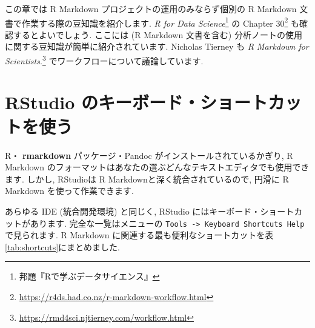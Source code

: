 \documentclass[
  11pt,
  lualatex,
  ja=standard]{bxjsreport}
\renewcommand{\href}[2]{#2\footnote{\url{#1}}}
\begin{document}
この章では R Markdown プロジェクトの運用のみならず個別の R Markdown 文書で作業する際の豆知識を紹介します. \emph{R for Data Science}\footnote{邦題『Rで学ぶデータサイエンス』} \autocite{wickham2016} の \href{https://r4ds.had.co.nz/r-markdown-workflow.html}{Chapter 30} も確認するとよいでしょう. ここには (R Markdown 文書を含む) 分析ノートの使用に関する豆知識が簡単に紹介されています. Nicholas Tierney も \href{https://rmd4sci.njtierney.com/workflow.html}{\emph{R Markdown for Scientists}.} でワークフローについて議論しています.

\hypertarget{rstudio-shortcuts}{%
\section{RStudio のキーボード・ショートカットを使う}\label{rstudio-shortcuts}}

R・ \textbf{rmarkdown} パッケージ・Pandoc がインストールされているかぎり, R Markdown のフォーマットはあなたの選ぶどんなテキストエディタでも使用できます. しかし, RStudioは R Markdownと深く統合されているので, 円滑に R Markdown を使って作業できます.

あらゆる IDE (統合開発環境) と同じく, RStudio にはキーボード・ショートカットがあります. 完全な一覧はメニューの \texttt{Tools -\textgreater{}\ Keyboard\ Shortcuts\ Help} で見られます. R Markdown に関連する最も便利なショートカットを表\ref{tab:shortcuts}にまとめました.
\end{document}
